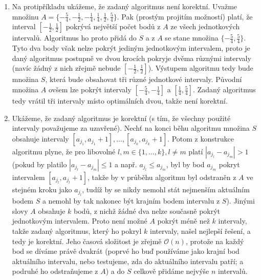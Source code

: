 \documentclass[12pt,a4paper]{article}
\theoremstyle{plain}
\begin{document}
\pagestyle{fancy}                      %
\fancyhf{}                             %
\addtolength{\topmargin}{-30 pt}                   %
\setlength{\headsep}{10 pt}                      %
\renewcommand{\headrulewidth}{1 pt}                %

\begin{enumerate}
\item Na protipříkladu ukážeme, že zadaný algoritmus není korektní. Uvažme množinu $A=\{-\frac{5}{4},-\frac{1}{2},-\frac{1}{4},\frac{1}{4},\frac{1}{2},\frac{5}{4}\}$. Pak (prostým projitím možností) platí, že interval $[-\frac{1}{2},\frac{1}{2}]$ pokrývá největší počet bodů z $A$ ze všech jednotkových intervalů. Algoritmus ho proto přidá do $S$ a z $A$ se stane množina $\{-\frac{5}{4},\frac{5}{4}\}$. Tyto dva body však nelze pokrýt jediným jednotkovým intervalem, proto je daný algoritmus postupně ve dvou krocích pokryje dvěma různými intervaly (navíc žádný z nich zřejmě nebude $[-\frac{1}{2},\frac{1}{2}]$). Výstupem algoritmu tedy bude množina $S$, která bude obsahovat tři různé jednotkové intervaly. Původní množina $A$ ovšem lze pokrýt intervaly $[-\frac{5}{4},-\frac{1}{4}]$ a $[\frac{1}{4},\frac{5}{4}]$. Zadaný algoritmus tedy vrátil tři intervaly místo optimálních dvou, takže není korektní.

\item Ukážeme, že zadaný algoritmus je korektní (s tím, že všechny použité intervaly považujeme za uzavřené). Nechť na konci běhu algoritmu množina $S$ obsahuje intervaly $[a_{j_1},a_{j_1}+1],\dots,[a_{j_k},a_{j_k}+1]$. Potom z konstrukce algoritmu plyne, že pro libovolné $l,m\in\{1,\dots,k\},l\neq m$ platí $|a_{j_l}-a_{j_m}|>1$ (pokud by platilo $|a_{j_l}-a_{j_m}|\leq 1$ a např. $a_{j_l}\leq a_{j_m}$, byl by bod $a_{j_m}$ pokryt intervalem $[a_{j_l},a_{j_l}+1]$, takže by v průběhu algoritmu byl odstraněn z $A$ ve stejném kroku jako $a_{j_l}$, tudíž by se nikdy nemohl stát nejmenším aktuálním bodem $S$ a nemohl by tak nakonec být krajním bodem intervalu z $S$). Jinými slovy $A$ obsahuje $k$ bodů, z nichž žádné dva nelze současně pokrýt jednotkovým intervalem. Proto není možné $A$ pokrýt méně než $k$ intervaly, takže zadaný algoritmus, který ho pokryl $k$ intervaly, našel nejlepší řešení, a tedy je korektní. Jeho časová složitost je zřejmě $\mathcal{O}(n)$, protože na každý bod se díváme právě dvakrát (poprvé ho buď používáme jako krajní bod aktuálního intervalu, nebo testujeme, zda do aktuálního intervalu patří; a podruhé ho odstraňujeme z $A$) a do $S$ celkově přidáme nejvýše $n$ intervalů.
\end{enumerate}
\end{document}

